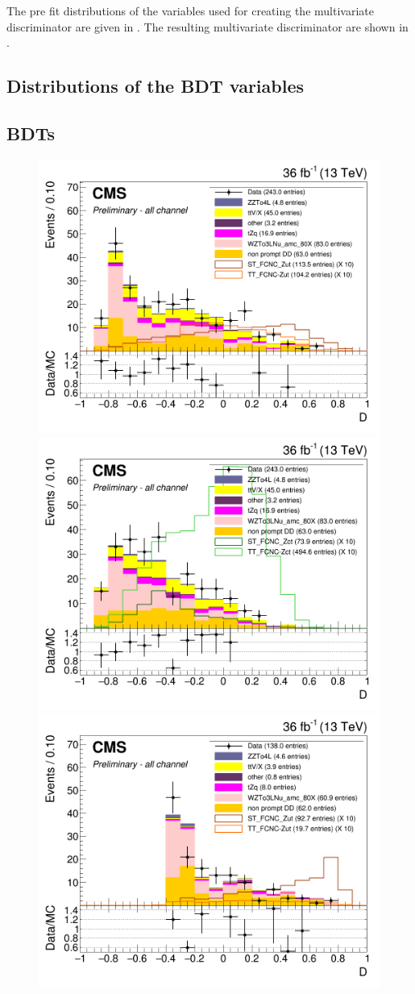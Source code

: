 The pre fit distributions of the variables used for creating the multivariate discriminator are given in . The resulting multivariate discriminator are shown in . 

\subsection{Distributions of the BDT variables}
\label{sec:BDTvars}


\subsection{BDTs}
\label{sec:BDTs}
\begin{figure}[htbp]
	\centering
	  \includegraphics[width=0.49\linewidth]{6_Search/Figures/BDTunweighted/toppair_Zut_BDT_all_Stack}
	  \includegraphics[width=0.49\linewidth]{6_Search/Figures/BDTunweighted/toppair_Zct_BDT_all_Stack}
	  \includegraphics[width=0.49\linewidth]{6_Search/Figures/BDTunweighted/singletop_Zut_BDT_all_Stack}

\end{figure}
